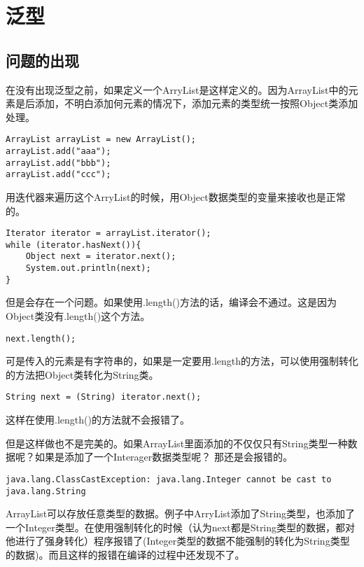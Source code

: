 \section*{泛型}

\subsection*{问题的出现}

在没有出现泛型之前，如果定义一个ArryList是这样定义的。因为ArrayList中的元素是后添加，不明白添加何元素的情况下，添加元素的类型统一按照Object类添加处理。
\begin{lstlisting}[style=Java]
ArrayList arrayList = new ArrayList();
arrayList.add("aaa");
arrayList.add("bbb");
arrayList.add("ccc");
\end{lstlisting}

用迭代器来遍历这个ArryList的时候，用Object数据类型的变量来接收也是正常的。
\begin{lstlisting}[style=Java]
Iterator iterator = arrayList.iterator();
while (iterator.hasNext()){
    Object next = iterator.next();
    System.out.println(next);
}
\end{lstlisting}

但是会存在一个问题。如果使用.length()方法的话，编译会不通过。这是因为Object类没有.length()这个方法。
\begin{lstlisting}[style=Java]
next.length();
\end{lstlisting}

可是传入的元素是有字符串的，如果是一定要用.length的方法，可以使用强制转化的方法把Object类转化为String类。
\begin{lstlisting}[style=Java]
String next = (String) iterator.next();
\end{lstlisting}

这样在使用.length()的方法就不会报错了。

但是这样做也不是完美的。如果ArrayList里面添加的不仅仅只有String类型一种数据呢？如果是添加了一个Interager数据类型呢？
那还是会报错的。


\begin{lstlisting}[style = Java]
java.lang.ClassCastException: java.lang.Integer cannot be cast to java.lang.String
\end{lstlisting}

ArrayList可以存放任意类型的数据。例子中ArryList添加了String类型，也添加了一个Integer类型。在使用强制转化的时候（认为next都是String类型的数据，都对他进行了强身转化）程序报错了(Integer类型的数据不能强制的转化为String类型的数据)。而且这样的报错在编译的过程中还发现不了。

